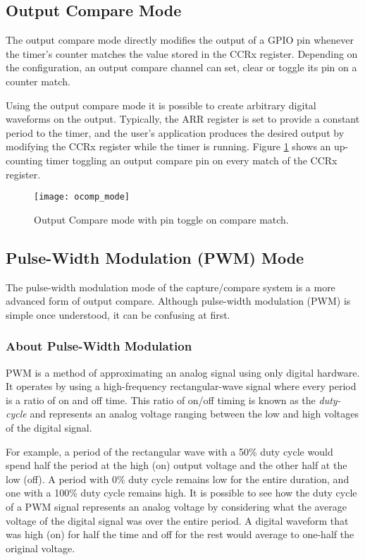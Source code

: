 \documentclass[11pt,fleqn]{book} %
\begin{document}
    
    \subsection{Output Compare Mode}
        The output compare mode directly modifies the output of a GPIO pin whenever the timer's counter matches the value stored in the CCRx register. Depending on the configuration, an output compare channel can set, clear or toggle its pin on a counter match. 
        
        Using the output compare mode it is possible to create arbitrary digital waveforms on the output. Typically, the ARR register is set to provide a constant period to the timer, and the user's application produces the desired output by modifying the CCRx register while the timer is running. Figure \ref{ocomp_mode} shows an up-counting timer toggling an output compare pin on every match of the CCRx register. 

        \begin{figure}[]
            \centering\texttt{[image: ocomp\_mode]}
            \caption{Output Compare mode with pin toggle on compare match.}
            \label{ocomp_mode}
        \end{figure}
    
    
    \subsection{Pulse-Width Modulation (PWM) Mode}
    The pulse-width modulation mode of the capture/compare system is a more advanced form of output compare. Although pulse-width modulation (PWM) is simple once understood, it can be confusing at first. 
    
    \subsubsection{About Pulse-Width Modulation}
    PWM is a method of approximating an analog signal using only digital hardware. It operates by using a high-frequency rectangular-wave signal where every period is a ratio of on and off time. This ratio of on/off timing is known as the \textit{duty-cycle} and represents an analog voltage ranging between the low and high voltages of the digital signal. 
    
    For example, a period of the rectangular wave with a 50\% duty cycle would spend half the period at the high (on) output voltage and the other half at the low (off). A period with 0\% duty cycle remains low for the entire duration, and one with a 100\% duty cycle remains high. It is possible to see how the duty cycle of a PWM signal represents an analog voltage by considering what the average voltage of the digital signal was over the entire period. A digital waveform that was high (on) for half the time and off for the rest would average to one-half the original voltage.  
    
\end{document}
